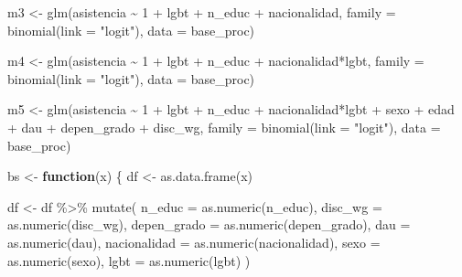 \documentclass[
  12pt,
  a4paper,
]{article}
\newenvironment{Shaded}{\begin{snugshade}}{\end{snugshade}}
\newcommand{\AttributeTok}[1]{\textcolor[rgb]{0.77,0.63,0.00}{#1}}
\newcommand{\ControlFlowTok}[1]{\textcolor[rgb]{0.13,0.29,0.53}{\textbf{#1}}}
\newcommand{\DecValTok}[1]{\textcolor[rgb]{0.00,0.00,0.81}{#1}}
\newcommand{\FunctionTok}[1]{\textcolor[rgb]{0.00,0.00,0.00}{#1}}
\newcommand{\NormalTok}[1]{#1}
\newcommand{\OtherTok}[1]{\textcolor[rgb]{0.56,0.35,0.01}{#1}}
\newcommand{\SpecialCharTok}[1]{\textcolor[rgb]{0.00,0.00,0.00}{#1}}
\newcommand{\StringTok}[1]{\textcolor[rgb]{0.31,0.60,0.02}{#1}}
\begin{document}
\begin{Shaded}
\begin{Highlighting}[]
\NormalTok{m3 }\OtherTok{\textless{}{-}} \FunctionTok{glm}\NormalTok{(asistencia }\SpecialCharTok{\textasciitilde{}} \DecValTok{1} \SpecialCharTok{+}\NormalTok{ lgbt }\SpecialCharTok{+}\NormalTok{ n\_educ }\SpecialCharTok{+}\NormalTok{ nacionalidad, }\AttributeTok{family =} \FunctionTok{binomial}\NormalTok{(}\AttributeTok{link =} \StringTok{"logit"}\NormalTok{), }
          \AttributeTok{data =}\NormalTok{ base\_proc) }

\NormalTok{m4 }\OtherTok{\textless{}{-}} \FunctionTok{glm}\NormalTok{(asistencia }\SpecialCharTok{\textasciitilde{}} \DecValTok{1} \SpecialCharTok{+}\NormalTok{ lgbt }\SpecialCharTok{+}\NormalTok{ n\_educ }\SpecialCharTok{+}\NormalTok{ nacionalidad}\SpecialCharTok{*}\NormalTok{lgbt, }\AttributeTok{family =} \FunctionTok{binomial}\NormalTok{(}\AttributeTok{link =} \StringTok{"logit"}\NormalTok{), }
          \AttributeTok{data =}\NormalTok{ base\_proc) }

\NormalTok{m5 }\OtherTok{\textless{}{-}} \FunctionTok{glm}\NormalTok{(asistencia }\SpecialCharTok{\textasciitilde{}} \DecValTok{1} \SpecialCharTok{+}\NormalTok{ lgbt }\SpecialCharTok{+}\NormalTok{ n\_educ }\SpecialCharTok{+}\NormalTok{ nacionalidad}\SpecialCharTok{*}\NormalTok{lgbt }\SpecialCharTok{+} 
\NormalTok{            sexo }\SpecialCharTok{+}\NormalTok{ edad }\SpecialCharTok{+}\NormalTok{ dau }\SpecialCharTok{+}\NormalTok{ depen\_grado }\SpecialCharTok{+}\NormalTok{ disc\_wg, }\AttributeTok{family =} \FunctionTok{binomial}\NormalTok{(}\AttributeTok{link =} \StringTok{"logit"}\NormalTok{), }
          \AttributeTok{data =}\NormalTok{ base\_proc) }


\NormalTok{bs }\OtherTok{\textless{}{-}} \ControlFlowTok{function}\NormalTok{(x) \{}
\NormalTok{  df }\OtherTok{\textless{}{-}} \FunctionTok{as.data.frame}\NormalTok{(x)}
  
\NormalTok{  df }\OtherTok{\textless{}{-}}\NormalTok{ df }\SpecialCharTok{\%\textgreater{}\%}
    \FunctionTok{mutate}\NormalTok{(}
      \AttributeTok{n\_educ =} \FunctionTok{as.numeric}\NormalTok{(n\_educ),}
      \AttributeTok{disc\_wg =} \FunctionTok{as.numeric}\NormalTok{(disc\_wg),}
      \AttributeTok{depen\_grado =} \FunctionTok{as.numeric}\NormalTok{(depen\_grado),}
      \AttributeTok{dau =} \FunctionTok{as.numeric}\NormalTok{(dau),}
      \AttributeTok{nacionalidad =} \FunctionTok{as.numeric}\NormalTok{(nacionalidad),}
      \AttributeTok{sexo =} \FunctionTok{as.numeric}\NormalTok{(sexo),}
      \AttributeTok{lgbt =} \FunctionTok{as.numeric}\NormalTok{(lgbt)}
\NormalTok{    )}
  

\end{Highlighting}
\end{Shaded}
\end{document}
